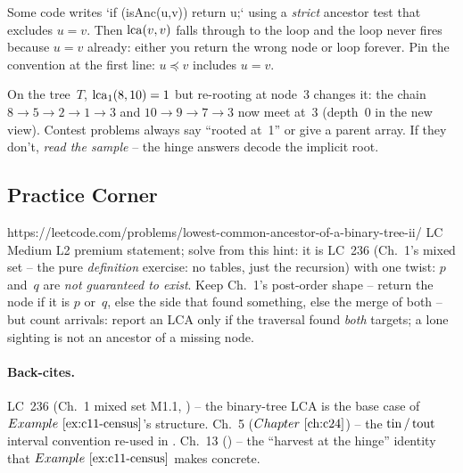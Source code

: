 \begin{warningbox}
Some code writes `if (isAnc(u,v)) return u;` using a \emph{strict}
ancestor test that excludes \(u=v\).  Then \(\operatorname{lca}(v,v)\) falls through to
the loop and the loop never fires because \(u = v\) already: either you
return the wrong node or loop forever.  Pin the convention at the first
line: \(u \preceq v\) includes \(u = v\).
\end{warningbox}

\begin{warningbox}
On the tree~\(T\), \(\operatorname{lca}_1(8,10)=1\) but re-rooting at node~3 changes it:
the chain \(8\to5\to2\to1\to3\) and \(10\to9\to7\to3\) now meet at~3
(depth~0 in the new view).  Contest problems always say ``rooted at~1''
or give a parent array.  If they don't, \emph{read the sample} -- the
hinge answers decode the implicit root.
\end{warningbox}

\subsection{Practice Corner}

\begin{practiceset}
    {https://leetcode.com/problems/lowest-common-ancestor-of-a-binary-tree-ii/}
    {LC Medium L2}
    {premium statement; solve from this hint: it is LC~236 (Ch.~1's mixed
     set -- the pure \emph{definition} exercise: no tables, just the
     recursion) with one twist: \(p\) and~\(q\) are \emph{not guaranteed
     to exist}.  Keep Ch.~1's post-order shape -- return the node if it is
     \(p\) or~\(q\), else the side that found something, else the merge of
     both -- but count arrivals: report an LCA only if the traversal found
     \emph{both} targets; a lone sighting is not an ancestor of a missing
     node.}
\end{practiceset}

\paragraph{Back-cites.}
LC~236 (Ch.~1 mixed set M1.1, ) -- the binary-tree LCA is the
base case of \(\exref{c11-census}\)'s structure.
Ch.~5 (\(\chref{c24}\)) -- the \(\operatorname{tin}/\operatorname{tout}\) interval convention
re-used in .
Ch.~13 () -- the ``harvest at the hinge'' identity
that \(\exref{c11-census}\) makes concrete.

